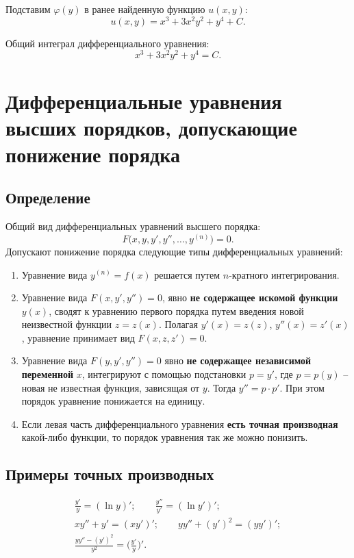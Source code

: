 \documentclass[a5paper, 11pt]{extbook}
\theoremstyle{definition}
\theoremstyle{definition}
\begin{document}
Подставим \(\varphi(y)\) в ранее найденную функцию \(u(x, y)\):
\[
    u(x, y) = x^3 + 3x^2y^2 + y^4 + C.
\]

Общий интеграл дифференциального уравнения:
\[
    x^3 + 3x^2y^2 + y^4 = C.
\]

\section{Дифференциальные уравнения высших порядков, допускающие понижение порядка}

\subsection{Определение}

Общий вид дифференциальных уравнений высшего порядка:
\[
    F \Big( x, y, y', y'', \ldots, y^{(n)} \Big) = 0.
\]
Допускают понижение порядка следующие типы дифференциальных уравнений:
\begin{enumerate}
    \item Уравнение вида \(y^{(n)} = f(x)\) решается путем \(n\)-кратного интегрирования.
    \item Уравнение вида \(F(x, y', y'') = 0\), явно \textbf{не содержащее искомой функции} \(y(x)\), сводят к уравнению первого порядка путем введения новой неизвестной функции \(z = z(x)\). Полагая \(y'(x) = z(z)\), \(y''(x) = z'(x)\), уравнение принимает вид \(F(x, z, z') = 0\).
    \item Уравнение вида \(F(y, y', y'') = 0\) явно \textbf{не содержащее независимой переменной} \(x\), интегрируют с помощью подстановки \(p = y'\), где \(p = p(y)\) -- новая не известная функция, зависящая от \(y\). Тогда \(y'' = p \cdot p'\). При этом порядок уравнение понижается на единицу.
    \item Если левая часть дифференциального уравнения \textbf{есть точная производная} какой-либо функции, то порядок уравнения так же можно понизить.
\end{enumerate}

\subsection{Примеры точных производных}

\begin{gather*}
    \frac{y'}{y} = (\ln y)';
    \qquad
    \frac{y''}{y'} = (\ln y')';
    \\
    xy'' + y' = (xy')';
    \qquad
    yy'' + (y')^2 = (yy')';
    \\
    \frac{yy'' - (y')^2}{y^2} = \Big( \frac{y'}{y} \Big)'.
\end{gather*}
\end{document}
